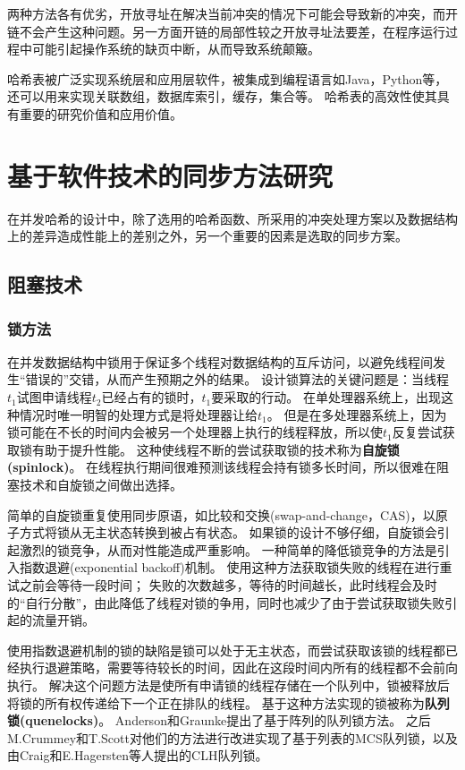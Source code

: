 两种方法各有优劣，开放寻址在解决当前冲突的情况下可能会导致新的冲突，而开链不会产生这种问题。另一方面开链的局部性较之开放寻址法要差，在程序运行过程中可能引起操作系统的缺页中断，从而导致系统颠簸。

哈希表被广泛实现系统层和应用层软件，被集成到编程语言如Java，Python等，还可以用来实现关联数组，数据库索引，缓存，集合等。
哈希表的高效性使其具有重要的研究价值和应用价值。

\section{基于软件技术的同步方法研究}

在并发哈希的设计中，除了选用的哈希函数、所采用的冲突处理方案以及数据结构上的差异造成性能上的差别之外，另一个重要的因素是选取的同步方案。

\subsection{阻塞技术}
\subsubsection{锁方法}
在并发数据结构中锁用于保证多个线程对数据结构的互斥访问，以避免线程间发生“错误的”交错，从而产生预期之外的结果。
设计锁算法的关键问题是：当线程$t_1$试图申请线程$t_2$已经占有的锁时，$t_1$要采取的行动。
在单处理器系统上，出现这种情况时唯一明智的处理方式是将处理器让给$t_1$。
但是在多处理器系统上，因为锁可能在不长的时间内会被另一个处理器上执行的线程释放，所以使$t_1$反复尝试获取锁有助于提升性能。
这种使线程不断的尝试获取锁的技术称为\textbf{自旋锁(spinlock)}。
在线程执行期间很难预测该线程会持有锁多长时间，所以很难在阻塞技术和自旋锁之间做出选择。

简单的自旋锁重复使用同步原语，如比较和交换(swap-and-change，CAS)，以原子方式将锁从无主状态转换到被占有状态。 如果锁的设计不够仔细，自旋锁会引起激烈的锁竞争，从而对性能造成严重影响。
一种简单的降低锁竞争的方法是引入指数退避(exponential backoff)机制\cite{agarwal1989adaptive}。
使用这种方法获取锁失败的线程在进行重试之前会等待一段时间；
失败的次数越多，等待的时间越长，此时线程会及时的“自行分散”，由此降低了线程对锁的争用，同时也减少了由于尝试获取锁失败引起的流量开销。

使用指数退避机制的锁的缺陷是锁可以处于无主状态，而尝试获取该锁的线程都已经执行退避策略，需要等待较长的时间，因此在这段时间内所有的线程都不会前向执行。
解决这个问题方法是使所有申请锁的线程存储在一个队列中，锁被释放后将锁的所有权传递给下一个正在排队的线程。
基于这种方法实现的锁被称为\textbf{队列锁(quenelocks)}。
Anderson\cite{anderson1989performance}和Graunke\cite{graunke1990synchronization}提出了基于阵列的队列锁方法。
之后M.Crummey和T.Scott\cite{mellor1991algorithms}对他们的方法进行改进实现了基于列表的MCS队列锁，以及由Craig和E.Hagersten等人\cite{craig1993building,magnusson1994queue}提出的CLH队列锁。

